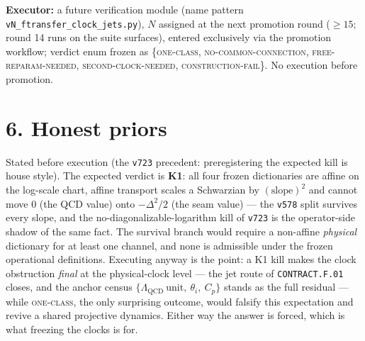 \documentclass[10pt,a4paper]{article}
\begin{document}
\textbf{Executor:} a future verification module (name pattern \texttt{vN\_ftransfer\_clock\_jets.py}),
$N$ assigned at the next promotion round ($\ge 15$; round 14 runs on the suite surfaces), entered
exclusively via the promotion workflow; verdict enum frozen as
\{\textsc{one-class}, \textsc{no-common-connection}, \textsc{free-reparam-needed},
\textsc{second-clock-needed}, \textsc{construction-fail}\}. No execution before promotion.

\section*{6. Honest priors}

Stated before execution (the \texttt{v723} precedent: preregistering the expected kill is house style).
The expected verdict is \textbf{K1}: all four frozen dictionaries are affine on the log-scale chart,
affine transport scales a Schwarzian by $(\text{slope})^2$ and cannot move $0$ (the QCD value) onto
$-\Delta^2/2$ (the seam value) --- the \texttt{v578} split survives every slope, and the
no-diagonalizable-logarithm kill of \texttt{v723} is the operator-side shadow of the same fact. The
survival branch would require a non-affine \emph{physical} dictionary for at least one channel, and none is
admissible under the frozen operational definitions. Executing anyway is the point: a K1 kill makes the
clock obstruction \emph{final} at the physical-clock level --- the jet route of \texttt{CONTRACT.F.01}
closes, and the anchor census $\{\Lambda_{\mathrm{QCD}}\ \text{unit},\ \theta_i,\ C_p\}$ stands as the full
residual --- while \textsc{one-class}, the only surprising outcome, would falsify this expectation and
revive a shared projective dynamics. Either way the answer is forced, which is what freezing the clocks is
for.
\end{document}
